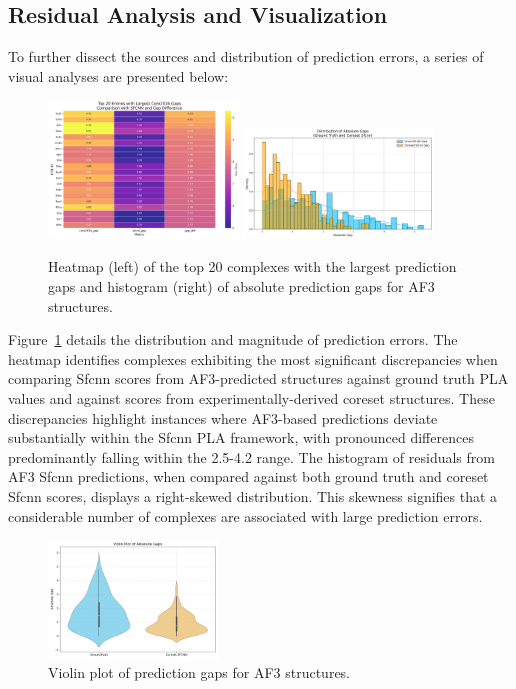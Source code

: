 \documentclass[unnumsec,webpdf,contemporary,large]{oup-authoring-template}
\theoremstyle{thmstyleone}%
\theoremstyle{thmstyletwo}%
\theoremstyle{thmstylethree}%
\begin{document}
\subsection{Residual Analysis and Visualization}
To further dissect the sources and distribution of prediction 
errors, a series of visual analyses are presented below:

\begin{figure}[H]
    \centering
    \includegraphics[width=0.45\textwidth]{images/top20_heatmap.png}
    \includegraphics[width=0.45\textwidth]{images/gap_histogram.png}
    \caption{Heatmap (left) of the top 20 complexes with the largest prediction gaps and histogram (right) of absolute prediction gaps for AF3 structures.}
    \label{fig:af3_heatmap_hist}
\end{figure}

Figure~\ref{fig:af3_heatmap_hist} details the distribution and magnitude of prediction errors. 
The heatmap identifies complexes exhibiting the most significant discrepancies when comparing Sfcnn scores from AF3-predicted structures against ground truth PLA values and against scores from experimentally-derived coreset structures. 
These discrepancies highlight instances where AF3-based predictions deviate substantially within the Sfcnn PLA framework, with pronounced differences predominantly falling within the 2.5-4.2 range.
The histogram of residuals from AF3 Sfcnn predictions, when compared against both ground truth and coreset Sfcnn scores, displays a right-skewed distribution. 
This skewness signifies that a considerable number of complexes are associated with large prediction errors.

\begin{figure}[H]
    \centering
    \includegraphics[width=0.4\textwidth]{images/gap_violinplot.png}
    \caption{Violin plot of prediction gaps for AF3 structures.}
    \label{fig:af3_gap_violin}
\end{figure}
\end{document}
